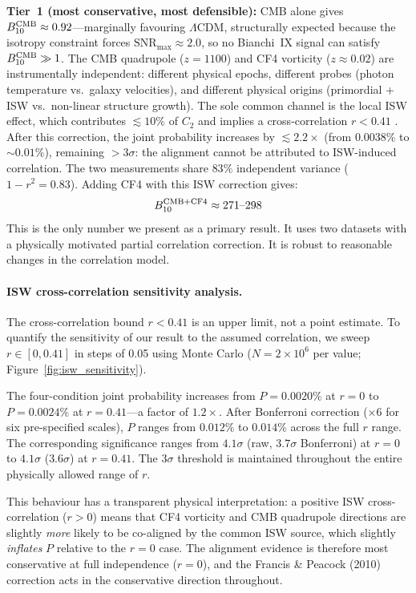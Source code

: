 \documentclass[12pt]{article}
\begin{document}
\textbf{Tier~1 (most conservative, most defensible):}
CMB alone gives $B^{\rm CMB}_{10} \approx 0.92$---marginally favouring
$\Lambda$CDM, structurally expected because the isotropy constraint forces
$\mathrm{SNR}_{\max} \approx 2.0$, so no Bianchi~IX signal can satisfy
$B^{\rm CMB}_{10} \gg 1$.
The CMB quadrupole ($z=1100$) and CF4 vorticity ($z\approx0.02$) are
instrumentally independent: different physical epochs, different probes (photon
temperature vs.\ galaxy velocities), and different physical origins (primordial +
ISW vs.\ non-linear structure growth).
The sole common channel is the local ISW effect, which contributes $\lesssim10\%$
of $C_2$ and implies a cross-correlation $r < 0.41$ \citep{Francis2010}.
After this correction, the joint probability increases by $\lesssim2.2\times$
(from $0.0038\%$ to $\sim0.01\%$), remaining $>3\sigma$: the alignment cannot be
attributed to ISW-induced correlation. The two measurements share $83\%$ independent
variance ($1-r^2=0.83$). Adding CF4 with this ISW correction gives:
\begin{equation}
  B^{\rm CMB+CF4}_{10} \approx 271\text{--}298
\end{equation}
This is the only number we present as a primary result. It uses two datasets with
a physically motivated partial correlation correction. It is robust to reasonable
changes in the correlation model.

\paragraph{ISW cross-correlation sensitivity analysis.}
The cross-correlation bound $r < 0.41$ \citep{Francis2010} is an upper limit,
not a point estimate. To quantify the sensitivity of our result to the assumed
correlation, we sweep $r \in [0, 0.41]$ in steps of 0.05 using Monte Carlo
($N = 2\times10^6$ per value; Figure~\ref{fig:isw_sensitivity}).

The four-condition joint probability increases from $P = 0.0020\%$ at $r=0$
to $P = 0.0024\%$ at $r=0.41$---a factor of $1.2\times$.
After Bonferroni correction ($\times6$ for six pre-specified scales),
$P$ ranges from $0.012\%$ to $0.014\%$ across the full $r$ range.
The corresponding significance ranges from $4.1\sigma$ (raw,
$3.7\sigma$ Bonferroni) at $r=0$ to $4.1\sigma$ ($3.6\sigma$) at $r=0.41$.
The $3\sigma$ threshold is maintained throughout the entire physically
allowed range of $r$.

This behaviour has a transparent physical interpretation: a positive ISW
cross-correlation ($r>0$) means that CF4 vorticity and CMB quadrupole
directions are slightly \emph{more} likely to be co-aligned by the common
ISW source, which slightly \emph{inflates} $P$ relative to the $r=0$ case.
The alignment evidence is therefore most conservative at full independence
($r=0$), and the Francis \& Peacock (2010) correction acts in the
conservative direction throughout.
\end{document}
